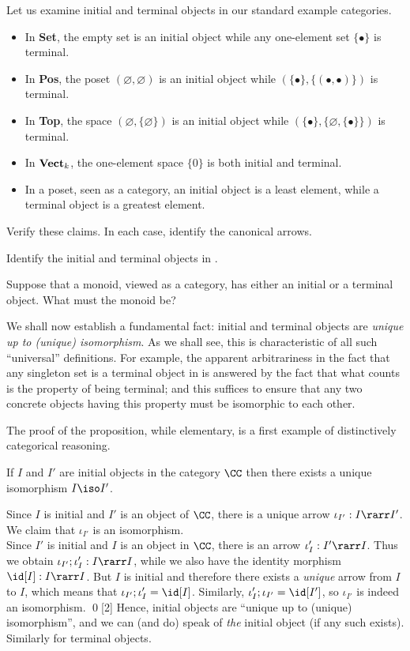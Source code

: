\documentclass[12pt]{article}
\begin{document}
Let us examine initial and terminal objects in our standard example categories.
\begin{itemize}
\item In \textbf{Set}, the empty set is an initial object while any one-element set $\{\bullet\}$ is terminal.
\item In \textbf{Pos}, the poset $(\varnothing,\varnothing)$ is an initial object while $(\{\bullet\}, \{ (\bullet,\bullet)\})$ is terminal.
\item In \textbf{Top}, the space $(\varnothing,\{\varnothing\})$ is an initial object while $(\{\bullet\},\{\varnothing,\{\bullet\}\})$ is terminal.
\item In $\text{\textbf{Vect}}_k$, the one-element space $\{0\}$ is both initial and terminal.
\item In a poset, seen as a category, an initial object is a least element, while a terminal object is a greatest element.
\end{itemize}
\begin{myexercise}
Verify these claims.
In each case, identify the canonical arrows.
\end{myexercise}
\begin{myexercise}
Identify the initial and terminal objects in .
\end{myexercise}
\begin{myexercise}
Suppose that a monoid, viewed as a category, has either an initial or a terminal object. What must the monoid be?
\end{myexercise}
%
We shall now establish a fundamental fact: initial and terminal objects are \emph{unique up to (unique) isomorphism}. As we shall see, this is characteristic of all such ``universal'' definitions.
For example, the apparent arbitrariness in the fact that any singleton set is a terminal object in  is answered by the fact that what counts is the property of being terminal; and this suffices to ensure that any two concrete objects having this property must be isomorphic to each other.

The proof of the proposition, while elementary, is a first example of distinctively categorical reasoning.
%
\begin{myproposition}
\label{inuniqueprop}
  If $I$ and $I'$ are initial objects in the category $\CC$ then there exists a unique isomorphism $I\iso I'$.
\end{myproposition}
\proof%
Since $I$ is initial and $I'$ is an object of $\CC$, there is a unique arrow $\iota_{I'}:I\rarr I'$. We claim that $\iota_{I'}$ is  an isomorphism.
\\
Since $I'$ is initial and $I$ is an object in $\CC$, there is an arrow $\iota'_I:I'\rarr I$. Thus we obtain $\iota_{I'};\iota'_I:I\rarr I$, while we
also have the identity morphism $\id[I]:I\rarr I$. But $I$ is initial and therefore there exists a \emph{unique} arrow from $I$ to $I$, which means that
$\iota_{I'};\iota'_I=\id[I]$. Similarly, $\iota'_{I};\iota_{I'}=\id[I']$, so $\iota_{I'}$ is indeed an isomorphism. \qed[2]
%
Hence, initial objects are ``unique up to (unique) isomorphism'', and we can (and do) speak of \emph{the} initial object (if any such exists). Similarly for terminal objects.
\end{document}
